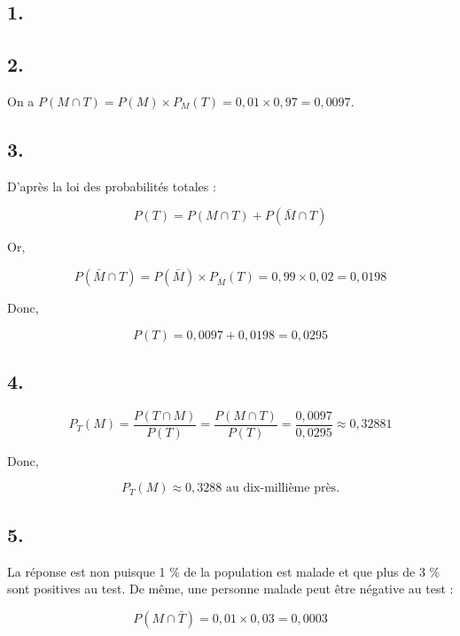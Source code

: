 \subsection*{1.}
	
	
	\subsection*{2.}
	
	
	On a \(P(M \cap T) = P(M) \times P_M(T) = 0,01 \times 0,97 = 0,0097\).
	
	\subsection*{3.}
	
	D'après la loi des probabilités totales :
	
	\[ P(T) = P(M \cap T) + P(\bar{M} \cap T) \]
	
	Or,
	
	\[ P(\bar{M} \cap T) = P(\bar{M}) \times P_{\bar{M}}(T) = 0,99 \times 0,02 = 0,0198 \]
	
	Donc,
	
	\[ P(T) = 0,0097 + 0,0198 = 0,0295 \]
	
	\subsection*{4.}
		
	
	\[ P_T(M) = \dfrac{P(T \cap M)}{P(T)} = \dfrac{P(M \cap T)}{P(T)} = \dfrac{0,0097}{0,0295} \approx 0,32881 \]
	
	Donc,
	
	\[ P_T(M) \approx 0,3288 \text{ au dix-millième près.} \]
	
	\subsection*{5.}
	
		La réponse est non puisque 1 \% de la population est malade et que plus de 3 \% sont positives au test. De même, une personne malade peut être négative au test :
	
	\[ P(M \cap \bar{T}) = 0,01 \times 0,03 = 0,0003 \]
